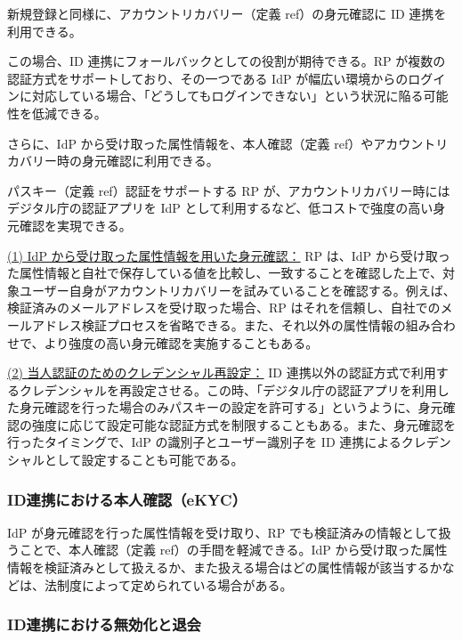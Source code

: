 \documentclass[uplatex]{jsarticle}
\def\ref#1{ref}%
\def\label#1{}%
\begin{document}
新規登録と同様に、アカウントリカバリー（定義 \ref{dfn:account-recovery}）の身元確認に ID 連携を利用できる。

この場合、ID 連携にフォールバックとしての役割が期待できる。RP が複数の認証方式をサポートしており、その一つである IdP が幅広い環境からのログインに対応している場合、「どうしてもログインできない」という状況に陥る可能性を低減できる。

さらに、IdP から受け取った属性情報を、本人確認（定義 \ref{dfn:kyc}）やアカウントリカバリー時の身元確認に利用できる。

\begin{exa}\label{exa:ch4-passkey-recovery}
パスキー（定義 \ref{dfn:passkey}）認証をサポートする RP が、アカウントリカバリー時にはデジタル庁の認証アプリを IdP として利用するなど、低コストで強度の高い身元確認を実現できる。
\end{exa}

\underline{(1) IdP から受け取った属性情報を用いた身元確認：}
RP は、IdP から受け取った属性情報と自社で保存している値を比較し、一致することを確認した上で、対象ユーザー自身がアカウントリカバリーを試みていることを確認する。例えば、検証済みのメールアドレスを受け取った場合、RP はそれを信頼し、自社でのメールアドレス検証プロセスを省略できる。また、それ以外の属性情報の組み合わせで、より強度の高い身元確認を実施することもある。

\underline{(2) 当人認証のためのクレデンシャル再設定：}
ID 連携以外の認証方式で利用するクレデンシャルを再設定させる。この時、「デジタル庁の認証アプリを利用した身元確認を行った場合のみパスキーの設定を許可する」というように、身元確認の強度に応じて設定可能な認証方式を制限することもある。また、身元確認を行ったタイミングで、IdP の識別子とユーザー識別子を ID 連携によるクレデンシャルとして設定することも可能である。

\subsubsection{ID連携における本人確認（eKYC）}

IdP が身元確認を行った属性情報を受け取り、RP でも検証済みの情報として扱うことで、本人確認（定義 \ref{dfn:kyc}）の手間を軽減できる。IdP から受け取った属性情報を検証済みとして扱えるか、また扱える場合はどの属性情報が該当するかなどは、法制度によって定められている場合がある。

\subsubsection{ID連携における無効化と退会}
\end{document}

